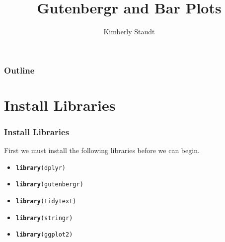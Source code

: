 \documentclass{beamer}\usepackage[]{graphicx}\usepackage[]{color}
\makeatletter
\newcommand{\hlstd}[1]{\textcolor[rgb]{0.345,0.345,0.345}{#1}}%
\newcommand{\hlkwd}[1]{\textcolor[rgb]{0.737,0.353,0.396}{\textbf{#1}}}%
\newenvironment{kframe}{%
 \def\at@end@of@kframe{}%
 \ifinner\ifhmode%
  \def\at@end@of@kframe{\end{minipage}}%
  \begin{minipage}{\columnwidth}%
 \fi\fi%
 \def\FrameCommand##1{\hskip\@totalleftmargin \hskip-\fboxsep
 \colorbox{shadecolor}{##1}\hskip-\fboxsep
     \hskip-\linewidth \hskip-\@totalleftmargin \hskip\columnwidth}%
 \MakeFramed {\advance\hsize-\width
   \@totalleftmargin\z@ \linewidth\hsize
   \@setminipage}}%
 {\par\unskip\endMakeFramed%
 \at@end@of@kframe}
\newenvironment{knitrout}{}{} %
\makeatother
\begin{document}
\title{Gutenbergr and Bar Plots}
\author{Kimberly Staudt}

\begin{frame}
  \titlepage
\end{frame}

\begin{frame}
  \frametitle{Outline}
    \tableofcontents
\end{frame}


\section{Install Libraries}
\begin{frame}[fragile]
  \frametitle{Install Libraries}

First we must install the following libraries before we can begin. 
    \begin{itemize}
      \item
\begin{knitrout}
\color{fgcolor}\begin{kframe}
\begin{alltt}
\hlkwd{library}\hlstd{(dplyr)}
\end{alltt}
\end{kframe}
\end{knitrout}
      \item
\begin{knitrout}
\color{fgcolor}\begin{kframe}
\begin{alltt}
\hlkwd{library}\hlstd{(gutenbergr)}
\end{alltt}
\end{kframe}
\end{knitrout}
    \item
\begin{knitrout}
\color{fgcolor}\begin{kframe}
\begin{alltt}
\hlkwd{library}\hlstd{(tidytext)}
\end{alltt}
\end{kframe}
\end{knitrout}
    \item
\begin{knitrout}
\color{fgcolor}\begin{kframe}
\begin{alltt}
\hlkwd{library}\hlstd{(stringr)}
\end{alltt}
\end{kframe}
\end{knitrout}
    \item
\begin{knitrout}
\color{fgcolor}\begin{kframe}
\begin{alltt}
\hlkwd{library}\hlstd{(ggplot2)}
\end{alltt}
\end{kframe}
\end{knitrout}
    

\end{itemize}
\end{frame}
\end{document}
